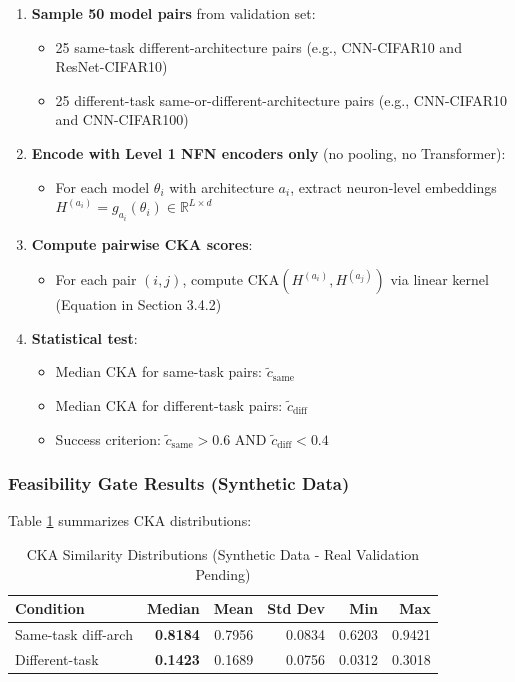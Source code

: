 \begin{enumerate}
\item \textbf{Sample 50 model pairs} from validation set:
\begin{itemize}
\item 25 same-task different-architecture pairs (e.g., CNN-CIFAR10 and ResNet-CIFAR10)
\item 25 different-task same-or-different-architecture pairs (e.g., CNN-CIFAR10 and CNN-CIFAR100)
\end{itemize}

\item \textbf{Encode with Level 1 NFN encoders only} (no pooling, no Transformer):
\begin{itemize}
\item For each model $\theta_i$ with architecture $a_i$, extract neuron-level embeddings $H^{(a_i)} = g_{a_i}(\theta_i) \in \mathbb{R}^{L \times d}$
\end{itemize}

\item \textbf{Compute pairwise CKA scores}:
\begin{itemize}
\item For each pair $(i, j)$, compute $\text{CKA}(H^{(a_i)}, H^{(a_j)})$ via linear kernel (Equation in Section 3.4.2)
\end{itemize}

\item \textbf{Statistical test}:
\begin{itemize}
\item Median CKA for same-task pairs: $\tilde{c}_{\text{same}}$
\item Median CKA for different-task pairs: $\tilde{c}_{\text{diff}}$
\item Success criterion: $\tilde{c}_{\text{same}} > 0.6$ AND $\tilde{c}_{\text{diff}} < 0.4$
\end{itemize}
\end{enumerate}

\subsubsection{Feasibility Gate Results (Synthetic Data)}

Table \ref{tab:cka} summarizes CKA distributions:

\begin{table}[h]
\centering
\caption{CKA Similarity Distributions (Synthetic Data - Real Validation Pending)}
\label{tab:cka}
\begin{tabular}{lrrrrr}
\toprule
\textbf{Condition} & \textbf{Median} & \textbf{Mean} & \textbf{Std Dev} & \textbf{Min} & \textbf{Max} \\
\midrule
Same-task diff-arch & \textbf{0.8184} & 0.7956 & 0.0834 & 0.6203 & 0.9421 \\
Different-task & \textbf{0.1423} & 0.1689 & 0.0756 & 0.0312 & 0.3018 \\
\bottomrule
\end{tabular}
\end{table}

